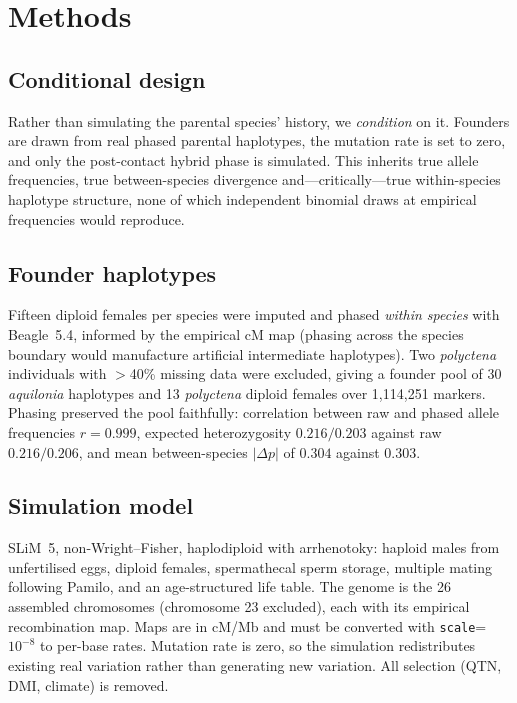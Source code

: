 \documentclass[11pt,a4paper]{article}
\begin{document}
\section{Methods}

\subsection{Conditional design}

Rather than simulating the parental species' history, we \emph{condition} on it.
Founders are drawn from real phased parental haplotypes, the mutation rate is set
to zero, and only the post-contact hybrid phase is simulated. This inherits true
allele frequencies, true between-species divergence and---critically---true
within-species haplotype structure, none of which independent binomial draws at
empirical frequencies would reproduce.

\subsection{Founder haplotypes}

Fifteen diploid females per species were imputed and phased \emph{within species}
with Beagle~5.4, informed by the empirical cM map (phasing across the species
boundary would manufacture artificial intermediate haplotypes). Two
\textit{polyctena} individuals with $>$40\% missing data were excluded, giving a
founder pool of 30 \textit{aquilonia} haplotypes and 13 \textit{polyctena} diploid
females over 1{,}114{,}251 markers. Phasing preserved the pool faithfully:
correlation between raw and phased allele frequencies $r=0.999$, expected
heterozygosity $0.216/0.203$ against raw $0.216/0.206$, and mean between-species
$|\Delta p|$ of $0.304$ against $0.303$.

\subsection{Simulation model}

SLiM~5, non-Wright--Fisher, haplodiploid with arrhenotoky: haploid males from
unfertilised eggs, diploid females, spermathecal sperm storage, multiple mating
following Pamilo, and an age-structured life table. The genome is the 26
assembled chromosomes (chromosome 23 excluded), each with its empirical
recombination map. Maps are in cM/Mb and must be converted with
\texttt{scale}=$10^{-8}$ to per-base rates. Mutation rate is zero, so the
simulation redistributes existing real variation rather than generating new
variation. All selection (QTN, DMI, climate) is removed.
\end{document}

